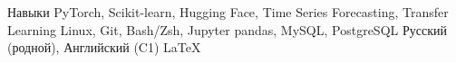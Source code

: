 
\begin{rubric}{Навыки}
\entry*[ML/DL]%
	PyTorch, Scikit-learn, Hugging Face, Time Series Forecasting, Transfer Learning
\entry*[Инфраструктура]%
	Linux, Git, Bash/Zsh, Jupyter
\entry*[Data \& DB]%
	pandas, MySQL, PostgreSQL
\entry*[Языки]%
	Русский (родной), Английский (C1)
\entry*[Доп.]%
	\LaTeX
\end{rubric}
